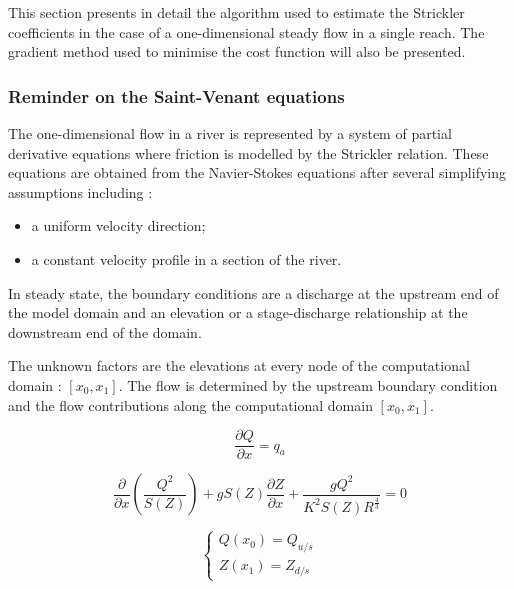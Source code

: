 This section presents in detail the algorithm used to estimate the Strickler coefficients in the case of a one-dimensional steady flow in a single reach. The gradient method used to minimise the cost function will also be presented.

\subsubsection{Reminder on the Saint-Venant equations}

The one-dimensional flow in a river is represented by a system of partial derivative equations where friction is modelled by the Strickler relation. These equations are obtained from the Navier-Stokes equations after several simplifying assumptions including :

\begin{itemize}
 \item a uniform velocity direction;
 \item a constant velocity profile in a section of the river.
\end{itemize}

\vspace{0.5cm}

In steady state, the boundary conditions are a discharge at the upstream end of the model domain and an elevation or a stage-discharge relationship at the downstream end of the domain.

\vspace{0.5cm}

The unknown factors are the elevations at every node of the computational domain : $[x_0,x_1]$. The flow is determined by the upstream boundary condition and the flow contributions along the computational domain $[x_0,x_1]$.

\begin{equation}
  \label{ContCas}
  \frac{\partial Q}{\partial x}= q_a
\end{equation}

\begin{equation}
  \label{DynCas}
  \frac{\partial}{\partial x} \left ( \frac{Q^2}{S(Z)} \right ) + g S(Z) \frac{\partial Z}{\partial x} + \frac{g Q^2}{K^2 S(Z) R^{\frac{4}{3}}} = 0
\end{equation}

\begin{equation}
 \left \lbrace
  \begin{array}{l}
    Q(x_0) = Q_{u/s} \\
    Z(x_1) = Z_{d/s}
  \end{array}
 \right.
\end{equation}

